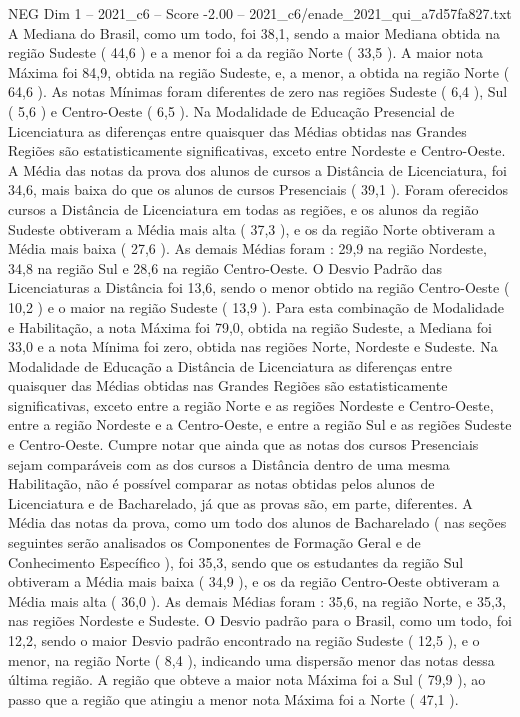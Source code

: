 \begin{textsample}{NEG Dim 1 – 2021\_c6 – Score -2.00 – 2021\_c6/enade\_2021\_qui\_a7d57fa827.txt}
A Mediana do Brasil, como um todo, foi 38,1, sendo a maior Mediana obtida na região Sudeste ( 44,6 ) e a menor foi a da região Norte ( 33,5 ).
A maior nota Máxima foi 84,9, obtida na região Sudeste, e, a menor, a obtida na região Norte ( 64,6 ).
As notas Mínimas foram diferentes de zero nas regiões Sudeste ( 6,4 ), Sul ( 5,6 ) e Centro-Oeste ( 6,5 ).
Na Modalidade de Educação Presencial de Licenciatura as diferenças entre quaisquer das Médias obtidas nas Grandes Regiões são estatisticamente significativas, exceto entre Nordeste e Centro-Oeste.
A Média das notas da prova dos alunos de cursos a Distância de Licenciatura, foi 34,6, mais baixa do que os alunos de cursos Presenciais ( 39,1 ).
Foram oferecidos cursos a Distância de Licenciatura em todas as regiões, e os alunos da região Sudeste obtiveram a Média mais alta ( 37,3 ), e os da região Norte obtiveram a Média mais baixa ( 27,6 ).
As demais Médias foram : 29,9 na região Nordeste, 34,8 na região Sul e 28,6 na região Centro-Oeste.
O Desvio Padrão das Licenciaturas a Distância foi 13,6, sendo o menor obtido na região Centro-Oeste ( 10,2 ) e o maior na região Sudeste ( 13,9 ).
Para esta combinação de Modalidade e Habilitação, a nota Máxima foi 79,0, obtida na região Sudeste, a Mediana foi 33,0 e a nota Mínima foi zero, obtida nas regiões Norte, Nordeste e Sudeste.
Na Modalidade de Educação a Distância de Licenciatura as diferenças entre quaisquer das Médias obtidas nas Grandes Regiões são estatisticamente significativas, exceto entre a região Norte e as regiões Nordeste e Centro-Oeste, entre a região Nordeste e a Centro-Oeste, e entre a região Sul e as regiões Sudeste e Centro-Oeste.
Cumpre notar que ainda que as notas dos cursos Presenciais sejam comparáveis com as dos cursos a Distância dentro de uma mesma Habilitação, não é possível comparar as notas obtidas pelos alunos de Licenciatura e de Bacharelado, já que as provas são, em parte, diferentes.
A Média das notas da prova, como um todo dos alunos de Bacharelado ( nas seções seguintes serão analisados os Componentes de Formação Geral e de Conhecimento Específico ), foi 35,3, sendo que os estudantes da região Sul obtiveram a Média mais baixa ( 34,9 ), e os da região Centro-Oeste obtiveram a Média mais alta ( 36,0 ).
As demais Médias foram : 35,6, na região Norte, e 35,3, nas regiões Nordeste e Sudeste.
O Desvio padrão para o Brasil, como um todo, foi 12,2, sendo o maior Desvio padrão encontrado na região Sudeste ( 12,5 ), e o menor, na região Norte ( 8,4 ), indicando uma dispersão menor das notas dessa última região.
A região que obteve a maior nota Máxima foi a Sul ( 79,9 ), ao passo que a região que atingiu a menor nota Máxima foi a Norte ( 47,1 ).

\end{textsample}
